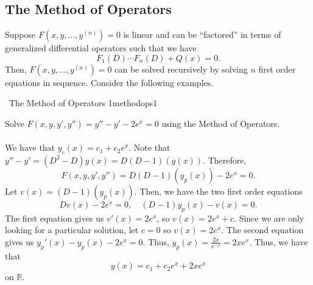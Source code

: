     \subsection{The Method of Operators}

        Suppose \(F(x,y,\ldots,y^{(n)})=0\) is linear and can be ``factored'' in terms of generalized differential operators such that we have
        \begin{equation*}
            F_1(D)\cdots F_n(D)+Q(x)=0.
        \end{equation*}
        Then, \(F(x,y,\ldots,y^{(n)})=0\) can be solved recursively by solving \(n\) first order equations in sequence. Consider the following examples.
        \begin{example}{\Difficulty\,\Difficulty\,\,The Method of Operators 1}{methodops1}

            Solve \(F(x,y,y',y'')=y''-y'-2e^x=0\) using the Method of Operators.
            \\
            \\
            We have that \(y_c(x)=c_1+c_2e^x\). Note that \(y''-y'=(D^2-D)y(x)=D(D-1)(y(x))\). Therefore,
            \begin{equation*}
                F(x,y,y',y'')=D(D-1)(y_p(x))-2e^x=0.
            \end{equation*}
            Let \(v(x)=(D-1)(y_p(x))\). Then, we have the two first order equations
            \begin{equation*}
                Dv(x)-2e^x=0,\quad (D-1)y_p(x)-v(x)=0.
            \end{equation*}
            The first equation gives us \(v'(x)=2e^x\), so \(v(x)=2e^x+c\). Since we are only looking for a particular solution, let \(c=0\) so \(v(x)=2e^x\). The second equation gives us \(y_p'(x)-y_p(x)-2e^x=0\). Thus, \(y_p(x)=\frac{2x}{e^{-x}}=2xe^x\). Thus, we have that
            \begin{equation*}
                y(x)=c_1+c_2e^x+2xe^x
            \end{equation*}
            on \(\mathbb{R}\).
        \end{example}
